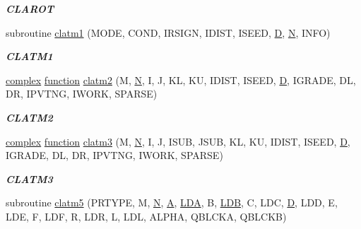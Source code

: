 \begin{DoxyCompactItemize}
\begin{DoxyCompactList}\small\item\em {\bfseries C\+L\+A\+R\+O\+T} \end{DoxyCompactList}\item 
subroutine \hyperlink{group__complex__matgen_gad3c84db8fbdfd2f970e682caa31e72a6}{clatm1} (M\+O\+D\+E, C\+O\+N\+D, I\+R\+S\+I\+G\+N, I\+D\+I\+S\+T, I\+S\+E\+E\+D, \hyperlink{odrpack_8h_a7dae6ea403d00f3687f24a874e67d139}{D}, \hyperlink{polmisc_8c_a0240ac851181b84ac374872dc5434ee4}{N}, I\+N\+F\+O)
\begin{DoxyCompactList}\small\item\em {\bfseries C\+L\+A\+T\+M1} \end{DoxyCompactList}\item 
\hyperlink{structcomplex}{complex} \hyperlink{afunc_8m_a7b5e596df91eadea6c537c0825e894a7}{function} \hyperlink{group__complex__matgen_ga2689df757dd5958a8c2911a648577d56}{clatm2} (M, \hyperlink{polmisc_8c_a0240ac851181b84ac374872dc5434ee4}{N}, I, J, K\+L, K\+U, I\+D\+I\+S\+T, I\+S\+E\+E\+D, \hyperlink{odrpack_8h_a7dae6ea403d00f3687f24a874e67d139}{D}, I\+G\+R\+A\+D\+E, D\+L, D\+R, I\+P\+V\+T\+N\+G, I\+W\+O\+R\+K, S\+P\+A\+R\+S\+E)
\begin{DoxyCompactList}\small\item\em {\bfseries C\+L\+A\+T\+M2} \end{DoxyCompactList}\item 
\hyperlink{structcomplex}{complex} \hyperlink{afunc_8m_a7b5e596df91eadea6c537c0825e894a7}{function} \hyperlink{group__complex__matgen_ga929f663f785e4b5841d06d9a947d670c}{clatm3} (M, \hyperlink{polmisc_8c_a0240ac851181b84ac374872dc5434ee4}{N}, I, J, I\+S\+U\+B, J\+S\+U\+B, K\+L, K\+U, I\+D\+I\+S\+T, I\+S\+E\+E\+D, \hyperlink{odrpack_8h_a7dae6ea403d00f3687f24a874e67d139}{D}, I\+G\+R\+A\+D\+E, D\+L, D\+R, I\+P\+V\+T\+N\+G, I\+W\+O\+R\+K, S\+P\+A\+R\+S\+E)
\begin{DoxyCompactList}\small\item\em {\bfseries C\+L\+A\+T\+M3} \end{DoxyCompactList}\item 
subroutine \hyperlink{group__complex__matgen_ga6b05f57659c673fb19b320ad9737810b}{clatm5} (P\+R\+T\+Y\+P\+E, M, \hyperlink{polmisc_8c_a0240ac851181b84ac374872dc5434ee4}{N}, \hyperlink{classA}{A}, \hyperlink{example__user_8c_ae946da542ce0db94dced19b2ecefd1aa}{L\+D\+A}, B, \hyperlink{example__user_8c_a50e90a7104df172b5a89a06c47fcca04}{L\+D\+B}, C, L\+D\+C, \hyperlink{odrpack_8h_a7dae6ea403d00f3687f24a874e67d139}{D}, L\+D\+D, E, L\+D\+E, F, L\+D\+F, R, L\+D\+R, L, L\+D\+L, A\+L\+P\+H\+A, Q\+B\+L\+C\+K\+A, Q\+B\+L\+C\+K\+B)

\end{DoxyCompactItemize}

